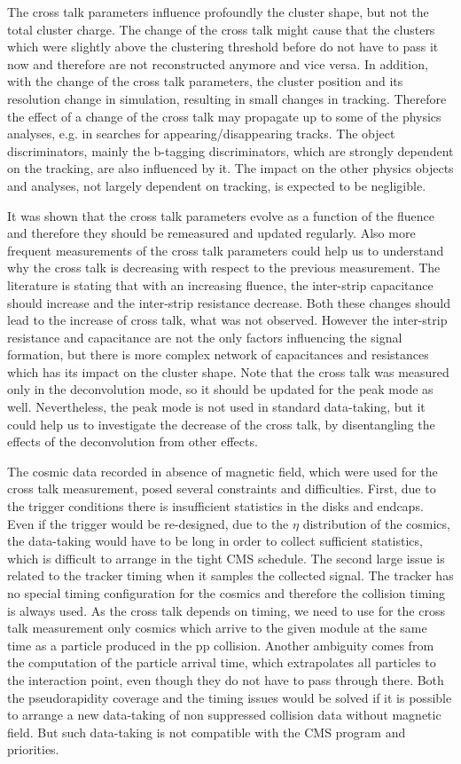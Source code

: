 The cross talk parameters influence profoundly the cluster shape, but not the total cluster charge. The change of the cross talk might cause that the clusters which were slightly above the clustering threshold before do not have to pass it now and therefore are not reconstructed anymore and vice versa. In addition, with the change of the cross talk parameters, the cluster position and its resolution change in simulation, resulting in small changes in tracking. Therefore the effect of a change of the cross talk may propagate up to some of the physics analyses, e.g. in searches for appearing/disappearing tracks. The object discriminators, mainly the b-tagging discriminators, which are strongly dependent on the tracking, are also influenced by it. The impact on the other physics objects and analyses, not largely dependent on tracking, is expected to be negligible.

It was shown that the cross talk parameters evolve as a function of the fluence and therefore they should be remeasured and updated regularly. Also more frequent measurements of the cross talk parameters could help us to understand why the cross talk is decreasing with respect to the previous measurement. The literature is stating that with an increasing fluence, the inter-strip capacitance should increase and the inter-strip resistance decrease. Both these changes should lead to the increase of cross talk, what was not observed. However the inter-strip resistance and capacitance are not the only factors influencing the signal formation, but there is more complex network of capacitances and resistances which has its impact on the cluster shape.  Note that the cross talk was measured only in the deconvolution mode, so it should be updated for the peak mode as well. Nevertheless, the peak mode is not used in standard data-taking, but it could help us to investigate the decrease of the cross talk, by disentangling the effects of the deconvolution from other effects.

The cosmic data recorded in absence of magnetic field, which were used for the cross talk measurement, posed several constraints and difficulties. First, due to the trigger conditions there is insufficient statistics in the disks and endcaps. Even if the trigger would be re-designed, due to the $\eta$ distribution of the cosmics, the data-taking would have to be long in order to collect sufficient statistics, which is difficult to arrange in the tight CMS schedule. The second large issue is related to the tracker timing when it samples the collected signal. The tracker has no special timing configuration for the cosmics and therefore the collision timing is always used.  As the cross talk depends on timing, we need to use for the cross talk measurement only cosmics which arrive to the given module at the same time as a particle produced in the pp collision. Another ambiguity comes from the computation of  the particle arrival time, which extrapolates all particles to the interaction point, even though they do not have to pass through there. Both the pseudorapidity coverage and the timing issues would be solved if it is possible to arrange a new data-taking of non suppressed collision data without magnetic field. But such data-taking is not compatible with the CMS program and priorities.

